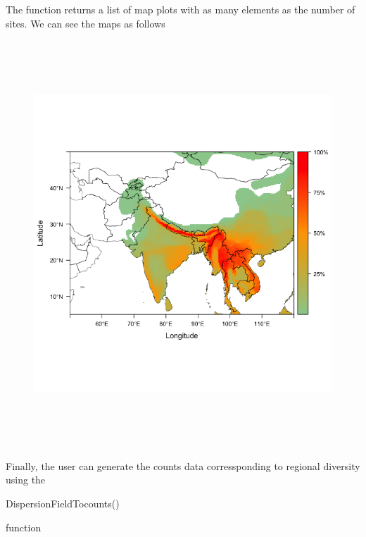 \documentclass[12pt]{article}
\begin{document}
The function returns a list of map plots with as many elements as the number of sites. We can see the maps as follows

\begin{knitrout}
\color{fgcolor}\begin{kframe}
\begin{alltt}
\hlstd{maps[[}\hlstd{]]}
\end{alltt}
\end{kframe}
\end{knitrout}

\begin{figure}[htp]
\begin{center}
\includegraphics[width=6in,height=6in]{figure/maps.png}
\end{center}
\end{figure}



Finally, the user can generate the counts data corressponding to regional diversity using the \begin{verb} DispersionFieldTocounts() \end{verb} function
\end{document}
